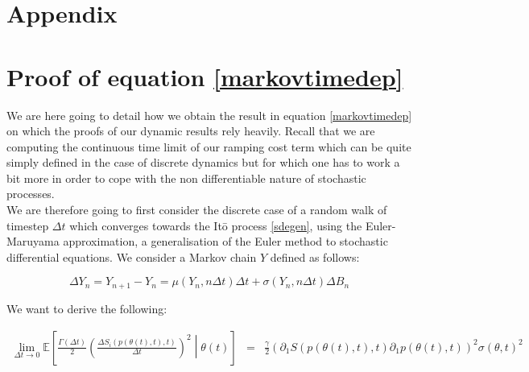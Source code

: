 %
%
\newpage
\begin{subappendices}
\section*{Appendix}

\section{Proof of equation \ref{markovtimedep}}\label{stochasticdyn_proof}
We are here going to detail how we obtain the result in equation \ref{markovtimedep} on which the proofs of our dynamic results rely heavily. Recall that we are computing the continuous time limit of our ramping cost term which can be quite simply defined in the case of discrete dynamics but for which one has to work a bit more in order to cope with the non differentiable nature of stochastic processes. \\

We are therefore going to first consider the discrete case of a random walk of timestep $\Delta t$ which converges towards the It\={o} process \ref{sdegen}, using the Euler-Maruyama approximation, a generalisation of the Euler method to stochastic differential equations. We consider a Markov chain $Y$ defined as follows: 

\begin{equation}
\Delta Y_n=Y_{n+1}-Y_n= \mu(Y_n,n \Delta t)\Delta t+\sigma (Y_n,n \Delta t)\Delta B_n
\end{equation}


We want to derive the following: 
\begin{footnotesize}
\begin{eqnarray}
\lim_{\Delta t \to 0}\mathbb{E}\left[\frac{\Gamma(\Delta t)}{2}\left(\frac{\Delta S_i(p(\theta(t),t),t)}{\Delta t}\right)^2\middle \vert \theta(t)  \right] &=& \frac{\gamma}{2} (\partial_1S(p(\theta(t),t),t)\partial_1p(\theta(t),t))^2 \sigma(\theta,t)^2
\end{eqnarray}
\end{footnotesize}


\end{subappendices}
